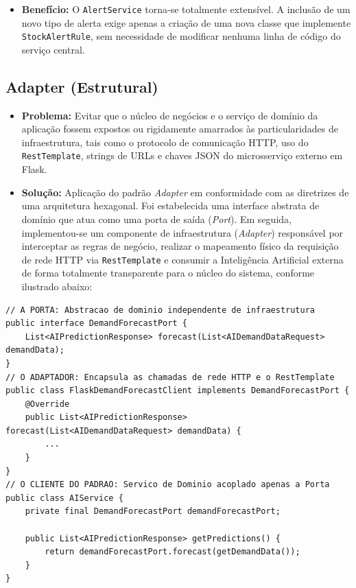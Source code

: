 \documentclass[12pt,a4paper]{article}
\begin{document}
\begin{itemize}
    \item \textbf{Benefício:} O \texttt{AlertService} torna-se totalmente extensível. A inclusão de um novo tipo de alerta exige apenas a criação de uma nova classe que implemente \texttt{StockAlertRule}, sem necessidade de modificar nenhuma linha de código do serviço central.
\end{itemize}

\subsection{Adapter (Estrutural)}
\begin{itemize}
    \item \textbf{Problema:} Evitar que o núcleo de negócios e o serviço de domínio da aplicação fossem expostos ou rigidamente amarrados às particularidades de infraestrutura, tais como o protocolo de comunicação HTTP, uso do \texttt{RestTemplate}, strings de URLs e chaves JSON do microsserviço externo em Flask.
    \item \textbf{Solução:} Aplicação do padrão \textit{Adapter} em conformidade com as diretrizes de uma arquitetura hexagonal. Foi estabelecida uma interface abstrata de domínio que atua como uma porta de saída (\textit{Port}). Em seguida, implementou-se um componente de infraestrutura (\textit{Adapter}) responsável por interceptar as regras de negócio, realizar o mapeamento físico da requisição de rede HTTP via \texttt{RestTemplate} e consumir a Inteligência Artificial externa de forma totalmente transparente para o núcleo do sistema, conforme ilustrado abaixo:
\end{itemize}

\begin{lstlisting}
// A PORTA: Abstracao de dominio independente de infraestrutura
public interface DemandForecastPort {
    List<AIPredictionResponse> forecast(List<AIDemandDataRequest> demandData);
}
// O ADAPTADOR: Encapsula as chamadas de rede HTTP e o RestTemplate
public class FlaskDemandForecastClient implements DemandForecastPort {
    @Override
    public List<AIPredictionResponse> forecast(List<AIDemandDataRequest> demandData) {
        ...
    }
}
// O CLIENTE DO PADRAO: Servico de Dominio acoplado apenas a Porta
public class AIService {
    private final DemandForecastPort demandForecastPort;

    public List<AIPredictionResponse> getPredictions() {
        return demandForecastPort.forecast(getDemandData());
    }
}
\end{lstlisting}
\end{document}
